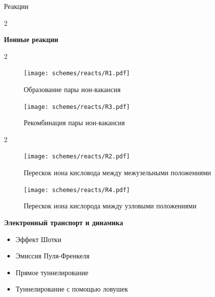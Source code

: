 \documentclass{beamer}%
\begin{document}
\begin{frame} {Реакции}

    \begin {multicols} {2}

    \textbf{Ионные реакции}
    \begin {multicols} {2}
    \begin{figure}
        
        \centering
        \texttt{[image: schemes/reacts/R1.pdf]}
        \caption{Образование пары ион-вакансия}
        
    \end{figure}

    \columnbreak
    \begin{figure}

        \centering
        \texttt{[image: schemes/reacts/R3.pdf]}
        \caption{Рекомбинация пары ион-вакансия}

    \end{figure}

    \end{multicols}

    \begin {multicols} {2}
        
    \begin{figure}

        \centering
        \texttt{[image: schemes/reacts/R2.pdf]}
        \caption{Перескок иона кисловода между межузельными положениями}

    \end{figure}
    \columnbreak
    \begin{figure}

        \centering
        \texttt{[image: schemes/reacts/R4.pdf]}
        \caption{Перескок иона кислорода мижду узловыми положениями}

    \end{figure}
    \end{multicols}

    \columnbreak

    \textbf{Электронный транспорт и динамика}
    \begin{itemize}
        \item Эффект Шотки
        \item Эмиссия Пуля-Френкеля
        \item Прямое туннелирование
        \item Туннелирование с помощью ловушек
    \end{itemize}

    \end{multicols}
\end{frame}
\end{document}
